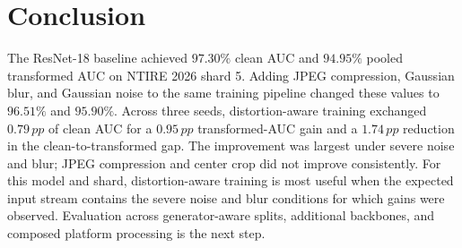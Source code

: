 \documentclass[conference]{IEEEtran}
\newcommand{\pp}{\,pp}
\begin{document}
\section{Conclusion}
\label{sec:conclusion}

The ResNet-18 baseline achieved $97.30\%$ clean AUC and $94.95\%$ pooled
transformed AUC on NTIRE 2026 shard 5. Adding JPEG compression, Gaussian blur,
and Gaussian noise to the same training pipeline changed these values to
$96.51\%$ and $95.90\%$. Across three seeds, distortion-aware training exchanged
$0.79\pp$ of clean AUC for a $0.95\pp$ transformed-AUC gain and a $1.74\pp$
reduction in the clean-to-transformed gap. The improvement was largest under
severe noise and blur; JPEG compression and center crop did not improve
consistently. For this model and shard, distortion-aware training is most
useful when the expected input stream contains the severe noise and blur
conditions for which gains were observed. Evaluation across generator-aware
splits, additional backbones, and composed platform processing is the next
step.

\balance


\end{document}
